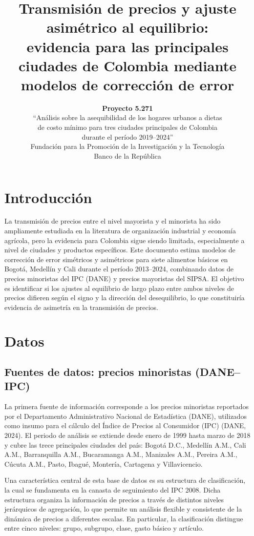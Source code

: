 \documentclass[
  12pt,
]{article}
\title{\textbf{Transmisión de precios y ajuste asimétrico al
equilibrio:\\
evidencia para las principales ciudades de Colombia mediante\\
modelos de corrección de error}}
\author{\textbf{Proyecto 5.271}\\
``Análisis sobre la asequibilidad de los hogares urbanos a dietas\\
de costo mínimo para tres ciudades principales de Colombia\\
durante el período 2019--2024''\\
Fundación para la Promoción de la Investigación y la Tecnología\\
Banco de la República}
\date{}
\begin{document}
\maketitle

\section{Introducción}\label{introducciuxf3n}

La transmisión de precios entre el nivel mayorista y el minorista ha
sido ampliamente estudiada en la literatura de organización industrial y
economía agrícola, pero la evidencia para Colombia sigue siendo
limitada, especialmente a nivel de ciudades y productos específicos.
Este documento estima modelos de corrección de error simétricos y
asimétricos para siete alimentos básicos en Bogotá, Medellín y Cali
durante el período 2013--2024, combinando datos de precios minoristas
del IPC (DANE) y precios mayoristas del SIPSA. El objetivo es
identificar si los ajustes al equilibrio de largo plazo entre ambos
niveles de precios difieren según el signo y la dirección del
desequilibrio, lo que constituiría evidencia de asimetría en la
transmisión de precios.

\section{Datos}\label{datos}

\subsection{Fuentes de datos: precios minoristas
(DANE--IPC)}\label{fuentes-de-datos-precios-minoristas-daneipc}

La primera fuente de información corresponde a los precios minoristas
reportados por el Departamento Administrativo Nacional de Estadística
(DANE), utilizados como insumo para el cálculo del Índice de Precios al
Consumidor (IPC) (DANE, 2024). El periodo de análisis se extiende desde
enero de 1999 hasta marzo de 2018 y cubre las trece principales ciudades
del país: Bogotá D.C., Medellín A.M., Cali A.M., Barranquilla A.M.,
Bucaramanga A.M., Manizales A.M., Pereira A.M., Cúcuta A.M., Pasto,
Ibagué, Montería, Cartagena y Villavicencio.

Una característica central de esta base de datos es su estructura de
clasificación, la cual se fundamenta en la canasta de seguimiento del
IPC 2008. Dicha estructura organiza la información de precios a través
de distintos niveles jerárquicos de agregación, lo que permite un
análisis flexible y consistente de la dinámica de precios a diferentes
escalas. En particular, la clasificación distingue entre cinco niveles:
grupo, subgrupo, clase, gasto básico y artículo.
\end{document}

